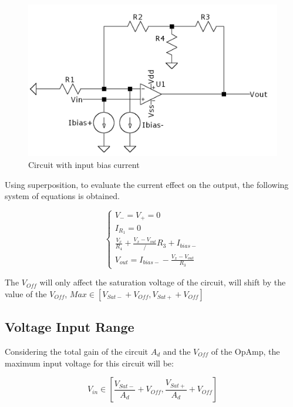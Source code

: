 \begin{figure}[H]
    \centering
    \includegraphics*[scale = 0.25]{Images/Ex1Bias.png}
    \caption{Circuit with input bias current}
    \label{Ex1Bias}
\end{figure}

Using superposition, to evaluate the current effect on the output, the following system of equations is obtained.


\begin{equation}
    \begin{cases}
    
        V_- = V_+ = 0 \\
        I_{R_1} = 0\\
        \frac{V_x}{R_4} + \frac{V_x - V_{out}}/R_3 + I_{bias-}\\
        V_{out} = I_{bias-} - \frac{V_x - V_{out}}{R_3}

    \end{cases}
\end{equation}

The $V_{Off}$ will only affect the saturation voltage of the circuit, will shift by the value of the $V_{Off}$, $Max \in [V_{Sat - } + V_{Off}, V_{Sat + } + V_{Off}]$

\subsection{Voltage Input Range}

Considering the total gain of the circuit $A_d$ and the $V_{Off}$ of the OpAmp, the maximum input voltage for this circuit will be:

\begin{equation}
   V_{in} \in [\frac{V_{Sat-}}{A_d} + V_{Off}, \frac{V_{Sat+}}{A_d} + V_{Off} ]
\end{equation}